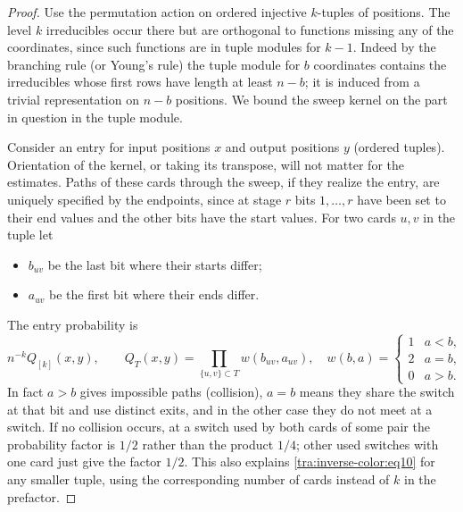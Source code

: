 \begin{proof}\label{tra:inverse-color:sparse-proof}
\label{tra:inverse-color:endpoint-kernel-and-forest-proof}
Use the permutation action on ordered injective \(k\)-tuples of positions. The level \(k\) irreducibles occur there but are orthogonal to functions missing any of the coordinates, since such functions are in tuple modules for \(k-1\). Indeed by the branching rule (or Young's rule) the tuple module for \(b\) coordinates contains the irreducibles whose first rows have length at least \(n-b\); it is induced from a trivial representation on \(n-b\) positions. We bound the sweep kernel on the part in question in the tuple module.

Consider an entry for input positions \(x\) and output positions \(y\) (ordered tuples). Orientation of the kernel, or taking its transpose, will not matter for the estimates. Paths of these cards through the sweep, if they realize the entry, are uniquely specified by the endpoints, since at stage \(r\) bits \(1,\ldots,r\) have been set to their end values and the other bits have the start values. For two cards \(u,v\) in the tuple let
\begin{itemize}
\item \(b_{uv}\) be the last bit where their starts differ;
\item \(a_{uv}\) be the first bit where their ends differ.

\end{itemize}
The entry probability is
\begin{equation}
          n^{-k} Q_{[k]}(x,y),\qquad
          Q_T(x,y)=\prod_{\{u,v\}\subset T} w(b_{uv},a_{uv}),\quad
 w(b,a)=
 \begin{cases}
 1&a<b,\\
 2&a=b,\\
 0&a>b.
 \end{cases}                                                                  \label{tra:inverse-color:eq10}
\end{equation}
In fact \(a>b\) gives impossible paths (collision), \(a=b\) means they share the switch at that bit and use distinct exits, and in the other case they do not meet at a switch. If no collision occurs, at a switch used by both cards of some pair the probability factor is \(1/2\) rather than the product \(1/4\); other used switches with one card just give the factor \(1/2\). This also explains \eqref{tra:inverse-color:eq10} for any smaller tuple, using the corresponding number of cards instead of \(k\) in the prefactor.


\end{proof}
